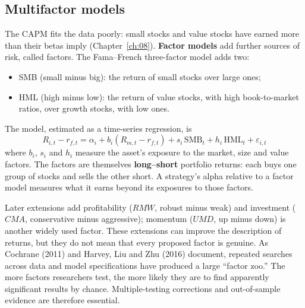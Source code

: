 
\subsection{Multifactor models}
\label{sec:03-factors}

The CAPM fits the data poorly: small stocks and value stocks have earned more than their betas imply (Chapter~\ref{ch:08}). \textbf{Factor models} add further sources of risk, called factors. The Fama--French three-factor model adds two:

\begin{itemize}
  \item SMB (small minus big): the return of small stocks over large ones;
  \item HML (high minus low): the return of value stocks, with high book-to-market ratios, over growth stocks, with low ones.
\end{itemize}

The model, estimated as a time-series regression, is
\begin{equation}
  R_{i,t} - r_{f,t} = \alpha_i + b_i(R_{m,t} - r_{f,t}) + s_i\,\mathrm{SMB}_t + h_i\,\mathrm{HML}_t + \varepsilon_{i,t}
  \label{eq:03-ff3}
\end{equation}
where $b_i$, $s_i$ and $h_i$ measure the asset's exposure to the market, size and value factors. The factors are themselves \textbf{long--short} portfolio returns: each buys one group of stocks and sells the other short. A strategy's alpha relative to a factor model measures what it earns beyond its exposures to those factors.

Later extensions add profitability ($RMW$, robust minus weak) and investment ($CMA$, conservative minus aggressive); momentum ($UMD$, up minus down) is another widely used factor. These extensions can improve the description of returns, but they do not mean that every proposed factor is genuine. As Cochrane (2011) and Harvey, Liu and Zhu (2016) document, repeated searches across data and model specifications have produced a large ``factor zoo.'' The more factors researchers test, the more likely they are to find apparently significant results by chance. Multiple-testing corrections and out-of-sample evidence are therefore essential.

